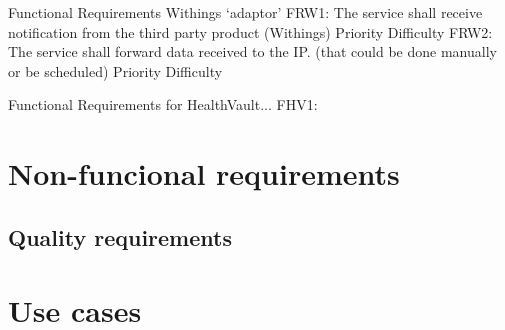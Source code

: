 Functional Requirements Withings ‘adaptor’
FRW1: The service shall receive notification from the third party product (Withings)
Priority
Difficulty
FRW2: The service shall forward data received to the IP. (that could be done manually or be scheduled)
Priority
Difficulty

Functional Requirements for HealthVault...
FHV1:



\section{Non-funcional requirements}

\subsection{Quality requirements}


\section{Use cases}

